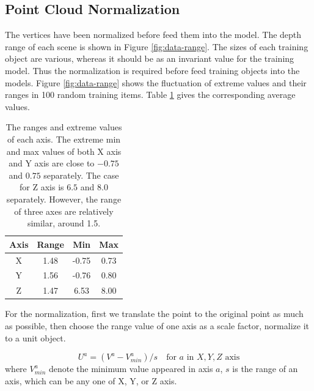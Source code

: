 \subsection{Point Cloud Normalization}


\label{sec:dataset-normalization}

The vertices have been normalized before feed them into the model. The depth range of each scene is shown in Figure \ref{fig:data-range}.
The sizes of each training object are various, whereas it should be as an invariant value for the training model. Thus the normalization is required before feed training objects into the models. Figure \ref{fig:data-range} shows the fluctuation of extreme values and their ranges in 100 random training items. Table \ref{tab:data-range} gives the corresponding average values.

\begin{table}[!h]
	\centering
	\begin{tabular}{|c|c|c|c|}
		\hline
		Axis & Range & Min & Max\\
		\hline
		X & 1.48 & -0.75 & 0.73\\
		Y & 1.56 & -0.76 & 0.80\\
		Z & 1.47 & 6.53 & 8.00\\
		\hline
	\end{tabular}
	\caption{The ranges and extreme values of each axis. The extreme min and max values of both X axis and Y axis are close to $ -0.75 $ and $ 0.75 $ separately. The case for Z axis is $ 6.5 $ and $ 8.0 $ separately. However, the range of three axes are relatively similar, around 1.5. 
	}
	\label{tab:data-range}
\end{table}


For the normalization, first we translate the point to the original point as much as possible, then choose the range value of one axis as a scale factor, normalize it to a unit object. 

\begin{equation}\label{eq:normalization}
	U^a = (V^a - V^a_{min}) / s  \quad  \text{for } a \text{ in }  X,Y,Z \text{ axis}
\end{equation}
where $ V^a_{min} $ denote the minimum value appeared in axis $ a $, $ s $ is the range of an axis, which can be any one of X, Y, or Z axis. 

